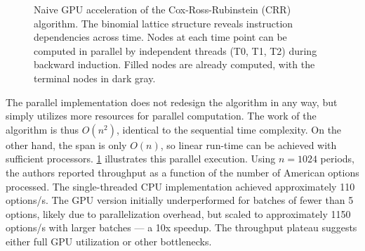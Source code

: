 \documentclass[english,12pt,a4paper,pdftex,sci,utf8]{aaltothesis}
\begin{document}
\begin{figure}[htbp]
    \centering
    \caption{Naive GPU acceleration of the Cox-Ross-Rubinstein (CRR) algorithm. The binomial lattice structure reveals instruction dependencies across time. Nodes at each time point can be computed in parallel by independent threads (T0, T1, T2) during backward induction. Filled nodes are already computed, with the terminal nodes in dark gray.}
    \label{fig:crr-gpu-naive}
\end{figure}

The parallel implementation does not redesign the algorithm in any way, but simply utilizes more resources for parallel computation. The work of the algorithm is thus $O(n^2)$, identical to the sequential time complexity. On the other hand, the span is only $O(n)$, so linear run-time can be achieved with sufficient processors. \cref{fig:crr-gpu-naive} illustrates this parallel execution. Using $n=1024$ periods, the authors reported throughput as a function of the number of American options processed. The single-threaded CPU implementation achieved approximately 110 options/s. The GPU version initially underperformed for batches of fewer than 5 options, likely due to parallelization overhead, but scaled to approximately 1150 options/s with larger batches --- a 10x speedup. The throughput plateau suggests either full GPU utilization or other bottlenecks.
\end{document}
